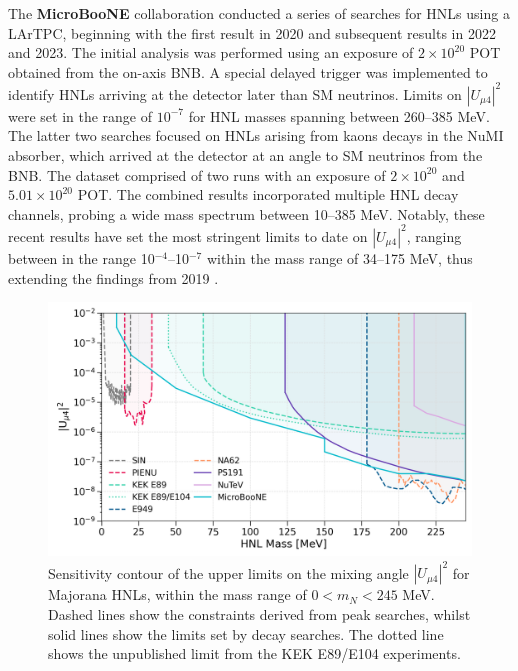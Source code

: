 \begin{coloritemize}
\item The \textbf{MicroBooNE} collaboration conducted a series of searches for HNLs using a LArTPC, beginning with the first result in 2020 and subsequent results in 2022 and 2023.
The initial analysis was performed using an exposure of $2 \times 10^{20}$ POT obtained from the on-axis BNB.
A special delayed trigger was implemented to identify HNLs arriving at the detector later than SM neutrinos.
Limits on $|U_{\mu4}|^{2}$ were set in the range of $10^{-7}$ for HNL masses spanning between 260--385 MeV.
The latter two searches focused on HNLs arising from kaons decays in the NuMI absorber, which arrived at the detector at an angle to SM neutrinos from the BNB.
The dataset comprised of two runs with an exposure of $2 \times 10^{20}$ and $5.01 \times 10^{20}$ POT.
The combined results incorporated multiple HNL decay channels, probing a wide mass spectrum between 10--385 MeV.
Notably, these recent results have set the most stringent limits to date on $|U_{\mu4}|^{2}$, ranging between in the range 10$^{-4}$--10$^{-7}$ within the mass range of 34--175 MeV, thus extending the findings from 2019 \cite{uboone1, uboone2, uboone3}.

\end{coloritemize}

\begin{figure}[t] 
\centering    
\includegraphics[width=1.0\textwidth]{sensitivity}
\caption[Sensitivity]{
Sensitivity contour of the upper limits on the mixing angle $|U_{\mu4}|^{2}$ for Majorana HNLs, within the mass range of $0 < m_{N} < 245$ MeV.
Dashed lines show the constraints derived from peak searches, whilst solid lines show the limits set by decay searches.
The dotted line shows the unpublished limit from the KEK E89/E104 experiments.
}
\label{fig:Sensitivity}
\end{figure}



